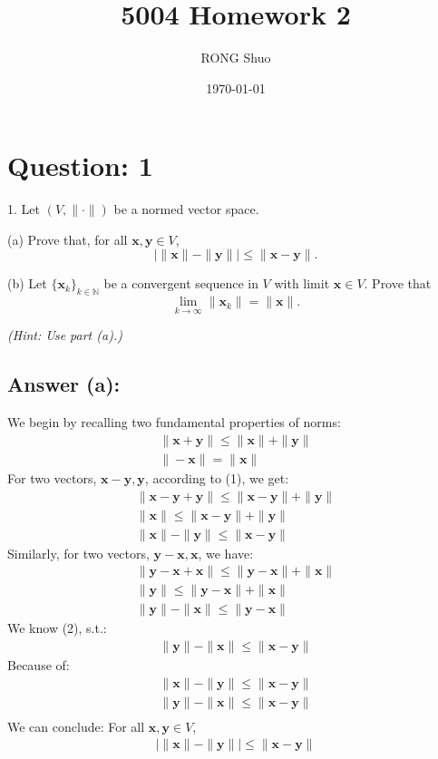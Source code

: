 \documentclass[a4paper,12pt]{article}
\newcommand{\N}{\mathbb{N}}
\begin{document}
\title{5004 Homework 2}
\author{RONG Shuo}
\date{\today}
\maketitle

\section*{Question: 1}
1. Let \((V, \|\cdot\|)\) be a normed vector space.

(a) Prove that, for all \(\bm{x}, \bm{y} \in V\),
\[
    |\|\bm{x}\| - \|\bm{y}\|| \leq \|\bm{x} - \bm{y}\|.
\]

(b) Let \(\{\bm{x}_k\}_{k\in \N}\) be a convergent sequence in \(V\) with limit \(\bm{x} \in V\). Prove that
\[
    \lim_{k\to\infty}\|\bm{x}_k\| = \|\bm{x}\|.
\]

\textit{(Hint: Use part (a).)}

\subsection*{Answer (a):}
We begin by recalling two fundamental properties of norms:
\begin{align}
    \|\bm{x} + \bm{y}\| \leq \|\bm{x}\| + \|\bm{y}\| \\
    \|-\bm{x}\| = \|\bm{x}\| 
\end{align}
For two vectors, \(\bm{x - y}, \bm{y}\), according to (1), we get:
\begin{align*}
    \|\bm{x} - \bm{y} + \bm{y}\| \leq \|\bm{x} - \bm{y}\| + \|\bm{y}\|  \\
    \|\bm{x}\| \leq \|\bm{x} - \bm{y}\| + \|\bm{y}\|  \\
    \|\bm{x}\| - \|\bm{y}\| \leq \|\bm{x} - \bm{y}\| 
\end{align*}
Similarly, for two vectors, \(\bm{y -x}, \bm{x}\), we have:
\begin{align*}
    \|\bm{y} - \bm{x} + \bm{x}\| \leq \|\bm{y} - \bm{x}\| + \|\bm{x}\|  \\
    \|\bm{y}\| \leq \|\bm{y} - \bm{x}\| + \|\bm{x}\|  \\
    \|\bm{y}\| - \|\bm{x}\| \leq \|\bm{y} - \bm{x}\| 
\end{align*}
We know (2), s.t.:
\begin{align*}
    \|\bm{y}\| - \|\bm{x}\| \leq \|\bm{x} - \bm{y}\| 
\end{align*}
Because of:
\begin{align*}
    \|\bm{x}\| - \|\bm{y}\| \leq \|\bm{x} - \bm{y}\|  \\
    \|\bm{y}\| - \|\bm{x}\| \leq \|\bm{x} - \bm{y}\|  \\
\end{align*}
We can conclude:
For all \(\bm{x}, \bm{y} \in V\),
\begin{align}
    |\|\bm{x}\| - \|\bm{y}\|| \leq \|\bm{x} - \bm{y}\|
\end{align}
\end{document}
